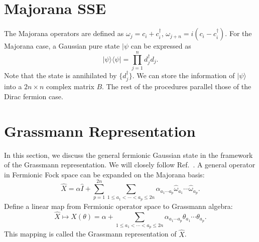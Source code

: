 \documentclass{SciPost}
\begin{document}
\section{Majorana SSE}
The Majorana operators are defined as ${\omega}_j ={c}_{i}+{c}_{i}^{\dagger}$, ${\omega}_{j+n} = i({c}_{i}-{c}_{i}^{\dagger})$.
For the Majorana case, a Gaussian pure state $|\psi$ can be expressed as 
\begin{equation}
	|\psi\rangle\langle\psi| = \prod_{j=1}^n  d_j^\dagger d_j.
\end{equation}
Note that the state is annihilated by $\{d_j^\dagger\}$. We can store the information of $|\psi\rangle$ into a $2n\times n$ complex matrix $B$. The rest of the procedures parallel those of the Dirac fermion case.



\section{Grassmann Representation}
In this section, we discuss the general fermionic Gaussian state in the framework of the Grassmann representation. We will closely follow Ref.~\cite{bravyi2004lagrangian}.  A general operator in Fermionic Fock space can be expanded on the Majorana basis:
\begin{equation}
	\hat{X}=\alpha\hat{I}+\sum_{p=1}^{2n}\sum_{1\le a_{1}<\cdots<a_{p}\le2n}\alpha_{a_{1}\cdots a_{p}}\hat{\omega}_{a_{1}}\cdots\hat{\omega}_{a_{p}}.
\end{equation}
Define a linear map from Fermionic operator space to Grassmann algebra:
\begin{equation}
	\hat X \mapsto X(\theta)=\alpha + \sum_{1\le a_{1}<\cdots<a_{p}\le2n}\alpha_{a_{1}\cdots a_{p}}\theta_{a_{1}}\cdots \theta_{a_{p}}.
\end{equation}
This mapping is called the Grassmann representation of $\hat X$. 
\end{document}
